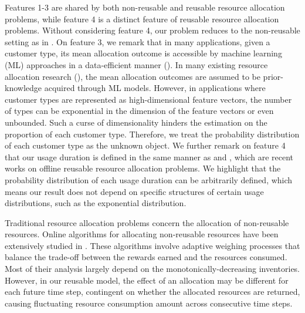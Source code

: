 \documentclass[letterpaper, 10 pt, conference]{ieeeconf}  %
\theoremstyle{plain}
\theoremstyle{definition}
\theoremstyle{remark}
\begin{document}
Features 1-3 are shared by both non-reusable and reusable resource allocation problems, while feature 4 is a distinct feature of reusable resource allocation problems. Without considering feature 4, our problem reduces to the non-reusable setting as in \cite{devanur2019near}. On feature 3, we remark that in many applications, given a customer type, its mean allocation outcome is accessible by machine learning (ML) approaches in a data-efficient manner (\cite{chen2022statistical,han2020neural,aouad2022representing}). In many existing resource allocation research (\cite{levi2010provably,chen2017revenue,lei2020real,baek2022bifurcating,besbes2021static}), the mean allocation outcomes are assumed to be prior-knowledge acquired through ML models. However, in applications where customer types are represented as high-dimensional feature vectors, the number of types can be exponential in the dimension of the feature vectors or even unbounded. Such a curse of dimensionality hinders the estimation on the proportion of each customer type. Therefore, we treat the probability distribution of each customer type as the unknown object. We further remark on feature 4 that our usage duration is defined in the same manner as \cite{lei2020real} and \cite{rusmevichientong2020dynamic}, which are recent works on offline reusable resource allocation problems. We highlight that the probability distribution of each usage duration can be arbitrarily defined, which means our result does not depend on specific structures of certain usage distributions, such as the exponential distribution.

Traditional resource allocation problems \cite{adelman2007dynamic, alaei2012online} concern the allocation of non-reusable resources. Online algorithms for allocating non-reusable resources have been extensively studied in \cite{agrawal2014fast, AgrawalWY14, balseiro2020dual, devanur2019near, FeldmanHKMS10, yu2017online, yuan2018online}. These algorithms involve adaptive weighing processes that balance the trade-off between the rewards earned and the resources consumed. Most of their analysis largely depend on the monotonically-decreasing inventories. However, in our reusable model, the effect of an allocation may be different for each future time step, contingent on whether the allocated resources are returned, causing fluctuating resource consumption amount across consecutive time steps.
\end{document}
